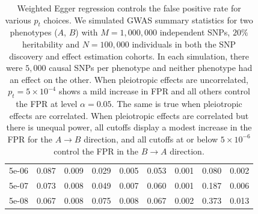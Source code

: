\documentclass{article}
\begin{document}
\begin{table}[H]
\begin{tabular}{lrrrrrrrr}
\hspace{1em}5e-06 & 0.087 & 0.009 & 0.029 & 0.005 & 0.053 & 0.001 & 0.080 & 0.002\\
\hspace{1em}5e-07 & 0.073 & 0.008 & 0.049 & 0.007 & 0.060 & 0.001 & 0.187 & 0.006\\
\hspace{1em}5e-08 & 0.067 & 0.008 & 0.075 & 0.008 & 0.067 & 0.002 & 0.373 & 0.013\\
\bottomrule
\end{tabular}
\caption{Weighted Egger regression controls the false positive rate for various
$p_t$ choices. We simulated GWAS summary statistics for two
 phenotypes ($A$, $B$) with $M=1,000,000$
independent SNPs, $20\%$ heritability and $N = 100,000$ individuals in both
 the SNP discovery and effect estimation cohorts. In each simulation, there
 were $5,000$ causal SNPs per phenotype and neither phenotype had an effect on the other. When
 pleiotropic effects are uncorrelated, $p_t = 5\times 10^{-4}$ shows a mild increase in
 FPR and all others control the FPR at level $\alpha = 0.05$. The same is true when pleiotropic
 effects are correlated. When pleiotropic effects are correlated but there is unequal power,
 all cutoffs display a modest increase in the FPR for the $A\rightarrow B$ direction, and
 all cutoffs at or below $5 \times 10^{-6}$ control the FPR in the $B\rightarrow A$ direction.}
\end{table}
\end{document}
